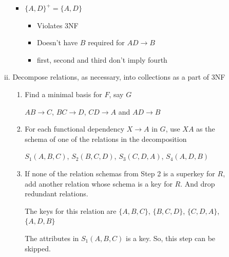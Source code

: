\documentclass[12pt]{article}
\begin{document}
\begin{enumerate}[1.]
\begin{enumerate}[a)]
\begin{enumerate}[i)]
\begin{itemize}
                \item $\{A,D\}^+ = \{A,D\}$
                \begin{itemize}
                    \item Violates 3NF
                    \item Doesn't have $B$ required for $AD \to B$
                    \item first, second and third don't imply fourth
                \end{itemize}
            \end{itemize}
            \color{black}

            \item Decompose relations, as necessary, into collections as a part of 3NF

            \bigskip

            \begin{enumerate}[1.]
                \item Find a minimal basis for $F$, say $G$

                \bigskip

                \color{red}
                $AB \to C$, $BC \to D$, $CD \to A$ and $AD \to B$
                \color{black}

                \bigskip

                \item For each functional dependency $X \to A$ in $G$, use $XA$
                as the schema of one of the relations in the decomposition

                \bigskip

                \color{red}
                $S_1(A,B,C)$, $S_2(B,C,D)$, $S_3(C,D,A)$, $S_4(A,D,B)$
                \color{black}

                \bigskip

                \item If none of the relation schemas from Step 2 is a superkey for $R$,
                add another relation whose schema is a key for $R$. And drop redundant relations.

                \bigskip

                \color{red}
                The keys for this relation are $\{A,B,C\}$, $\{B,C,D\}$, $\{C,D,A\}$,$\{A,D,B\}$

                \bigskip

                The attributes in $S_1(A,B,C)$ is a key. So, this step can be skipped.
                \color{black}


\end{enumerate}
\end{enumerate}
\end{enumerate}
\end{enumerate}
\end{document}
